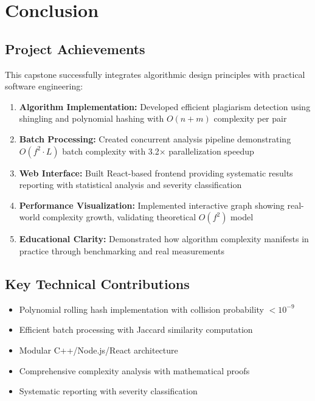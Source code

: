 \documentclass[12pt,oneside,openany]{report}
\begin{document}
\chapter{Conclusion}

\section{Project Achievements}

This capstone successfully integrates algorithmic design principles with practical software engineering:

\begin{enumerate}
  \item \textbf{Algorithm Implementation:} Developed efficient plagiarism detection using shingling and polynomial hashing with $O(n+m)$ complexity per pair
  
  \item \textbf{Batch Processing:} Created concurrent analysis pipeline demonstrating $O(f^2 \cdot L)$ batch complexity with 3.2× parallelization speedup
  
  \item \textbf{Web Interface:} Built React-based frontend providing systematic results reporting with statistical analysis and severity classification
  
  \item \textbf{Performance Visualization:} Implemented interactive graph showing real-world complexity growth, validating theoretical $O(f^2)$ model
  
  \item \textbf{Educational Clarity:} Demonstrated how algorithm complexity manifests in practice through benchmarking and real measurements
\end{enumerate}

\section{Key Technical Contributions}

\begin{itemize}
  \item Polynomial rolling hash implementation with collision probability $< 10^{-9}$
  \item Efficient batch processing with Jaccard similarity computation
  \item Modular C++/Node.js/React architecture
  \item Comprehensive complexity analysis with mathematical proofs
  \item Systematic reporting with severity classification
\end{itemize}
\end{document}
